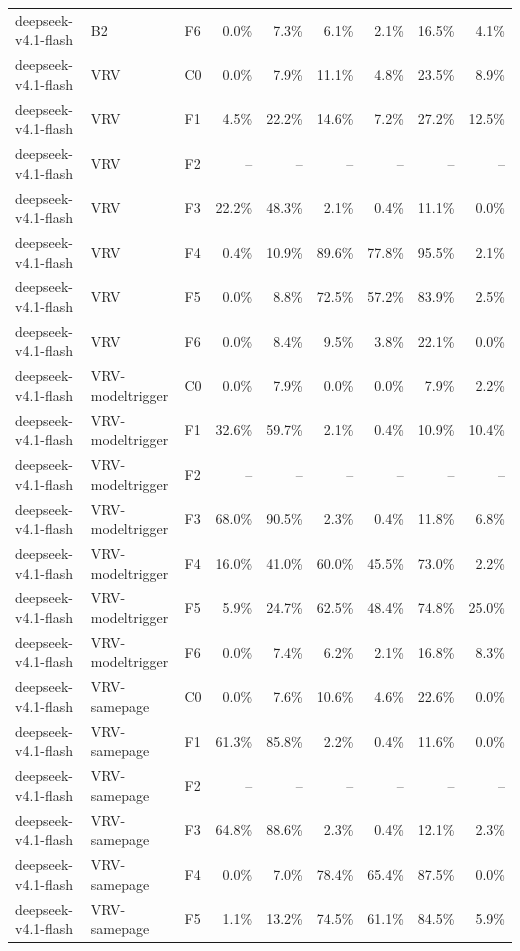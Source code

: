 \begin{tabular}{lllrrrrrr}
deepseek-v4.1-flash & B2 & F6 & 0.0\% & 7.3\% & 6.1\% & 2.1\% & 16.5\% & 4.1\% \\
deepseek-v4.1-flash & VRV & C0 & 0.0\% & 7.9\% & 11.1\% & 4.8\% & 23.5\% & 8.9\% \\
deepseek-v4.1-flash & VRV & F1 & 4.5\% & 22.2\% & 14.6\% & 7.2\% & 27.2\% & 12.5\% \\
deepseek-v4.1-flash & VRV & F2 & -- & -- & -- & -- & -- & -- \\
deepseek-v4.1-flash & VRV & F3 & 22.2\% & 48.3\% & 2.1\% & 0.4\% & 11.1\% & 0.0\% \\
deepseek-v4.1-flash & VRV & F4 & 0.4\% & 10.9\% & 89.6\% & 77.8\% & 95.5\% & 2.1\% \\
deepseek-v4.1-flash & VRV & F5 & 0.0\% & 8.8\% & 72.5\% & 57.2\% & 83.9\% & 2.5\% \\
deepseek-v4.1-flash & VRV & F6 & 0.0\% & 8.4\% & 9.5\% & 3.8\% & 22.1\% & 0.0\% \\
deepseek-v4.1-flash & VRV-modeltrigger & C0 & 0.0\% & 7.9\% & 0.0\% & 0.0\% & 7.9\% & 2.2\% \\
deepseek-v4.1-flash & VRV-modeltrigger & F1 & 32.6\% & 59.7\% & 2.1\% & 0.4\% & 10.9\% & 10.4\% \\
deepseek-v4.1-flash & VRV-modeltrigger & F2 & -- & -- & -- & -- & -- & -- \\
deepseek-v4.1-flash & VRV-modeltrigger & F3 & 68.0\% & 90.5\% & 2.3\% & 0.4\% & 11.8\% & 6.8\% \\
deepseek-v4.1-flash & VRV-modeltrigger & F4 & 16.0\% & 41.0\% & 60.0\% & 45.5\% & 73.0\% & 2.2\% \\
deepseek-v4.1-flash & VRV-modeltrigger & F5 & 5.9\% & 24.7\% & 62.5\% & 48.4\% & 74.8\% & 25.0\% \\
deepseek-v4.1-flash & VRV-modeltrigger & F6 & 0.0\% & 7.4\% & 6.2\% & 2.1\% & 16.8\% & 8.3\% \\
deepseek-v4.1-flash & VRV-samepage & C0 & 0.0\% & 7.6\% & 10.6\% & 4.6\% & 22.6\% & 0.0\% \\
deepseek-v4.1-flash & VRV-samepage & F1 & 61.3\% & 85.8\% & 2.2\% & 0.4\% & 11.6\% & 0.0\% \\
deepseek-v4.1-flash & VRV-samepage & F2 & -- & -- & -- & -- & -- & -- \\
deepseek-v4.1-flash & VRV-samepage & F3 & 64.8\% & 88.6\% & 2.3\% & 0.4\% & 12.1\% & 2.3\% \\
deepseek-v4.1-flash & VRV-samepage & F4 & 0.0\% & 7.0\% & 78.4\% & 65.4\% & 87.5\% & 0.0\% \\
deepseek-v4.1-flash & VRV-samepage & F5 & 1.1\% & 13.2\% & 74.5\% & 61.1\% & 84.5\% & 5.9\% \\

\end{tabular}
